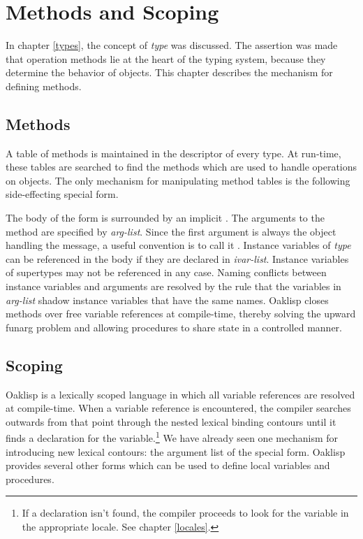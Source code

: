 \chapter{Methods and Scoping} \label{methods}

In chapter \ref{types}, the concept of {\it type} was discussed.
The assertion was made that operation methods lie at the heart of the
typing system, because they determine the behavior of objects.  This
chapter describes the mechanism for defining methods.

\section{Methods}

A table of methods is maintained in the descriptor of every type. At
run-time, these tables are searched to find the methods which are used
to handle operations on objects. The only mechanism for manipulating
method tables is the following side-effecting special form.


The body of the form is surrounded by an implicit .  The
arguments to the method are specified by {\em arg-list}.  Since the
first argument is always the object handling the message, a useful
convention is to call it .  Instance variables of {\em type}
can be referenced in the body if they are declared in {\em ivar-list}.
Instance variables of supertypes may not be referenced in any case.
Naming conflicts between instance variables and arguments are resolved
by the rule that the variables in {\em arg-list} shadow instance
variables that have the same names.  Oaklisp closes methods over free
variable references at compile-time, thereby solving the upward funarg
problem and allowing procedures to share state in a controlled manner.


\section{Scoping}

Oaklisp is a lexically scoped language in which all variable
references are resolved at compile-time.  When a variable reference is
encountered, the compiler searches outwards from that point through
the nested lexical binding contours until it finds a declaration for
the variable.\footnote{If a declaration isn't found, the compiler
proceeds to look for the variable in the appropriate locale. See
chapter \ref{locales}.} We have already seen one mechanism for
introducing new lexical contours: the argument list of the
 special form.  Oaklisp provides several other forms
which can be used to define local variables and procedures.

